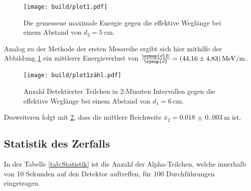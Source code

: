 \begin{figure}[H]
  \texttt{[image: build/plot1.pdf]}
  \caption{Die gemessene maximale Energie gegen die effektive Weglänge bei einem Abstand von $d_2=\qty{5}{\centi\meter}$.}
  \label{fig:energie2}
\end{figure}

Analog zu der Methode der ersten Messreihe ergibt sich hier mithilfe der Abbildung \ref{fig:energie2} 
ein mittlerer Energieverlust von $\frac{\symup{d}E}{\symup{d}}=\qty{44.16(4.83)}{\mega\electronvolt\per\meter}$.

\begin{figure}[H]
  \texttt{[image: build/plot1zähl.pdf]}
  \caption{Anzahl Detektierter Teilchen in 2-Minuten Intervallen gegen die effektive Weglänge bei einem Abstand von $d_1=\qty{6}{\centi\meter}$.}
  \label{fig:zaehl2}
\end{figure}

Desweiteren folgt mit \ref{fig:zaehl2}, dass die mittlere Reichweite $\bar{x}_2=\qty{0.018(0.003)}{\meter}$ ist.

\subsection{Statistik des Zerfalls}

In der Tabelle \ref{tab:Statistik} ist die Anzahl der Alpha-Teilchen, welche innerhalb von 10 Sekunden auf den Detektor auftreffen, für 100 Durchführungen eingetragen. 




